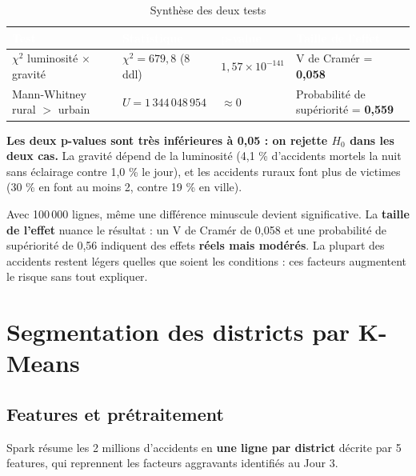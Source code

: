 \documentclass[11pt,a4paper]{report}
\newcommand{\hd}[1]{\textcolor{white}{\bfseries #1}}
\newcommand{\headrow}{\rowcolor{primary}}
\begin{document}
\begin{table}[H]
\centering
{}
\begin{tabularx}{\textwidth}{@{}l l l X@{}}
\toprule
\headrow \hd{Test} & \hd{Statistique} & \hd{p-value} & \hd{Taille de l'effet} \\
\midrule
$\chi^2$ luminosité $\times$ gravité & $\chi^2 = 679{,}8$ (8 ddl) & $1{,}57 \times 10^{-141}$ & V de Cramér = \textbf{0,058} \\
Mann-Whitney rural $>$ urbain & $U = 1\,344\,048\,954$ & $\approx 0$ & Probabilité de supériorité = \textbf{0,559} \\
\bottomrule
\end{tabularx}
\caption{Synthèse des deux tests}
\end{table}

\begin{keybox}[Interprétation]
\textbf{Les deux p-values sont très inférieures à 0,05 : on rejette $H_0$ dans les deux cas.} La gravité dépend de la luminosité (4,1 \% d'accidents mortels la nuit sans éclairage contre 1,0 \% le jour), et les accidents ruraux font plus de victimes (30 \% en font au moins 2, contre 19 \% en ville).
\end{keybox}

\begin{warnbox}
Avec 100\,000 lignes, même une différence minuscule devient significative. La \textbf{taille de l'effet} nuance le résultat : un V de Cramér de 0,058 et une probabilité de supériorité de 0,56 indiquent des effets \textbf{réels mais modérés}. La plupart des accidents restent légers quelles que soient les conditions : ces facteurs augmentent le risque sans tout expliquer.
\end{warnbox}

\section{Segmentation des districts par K-Means}

\subsection{Features et prétraitement}

Spark résume les 2 millions d'accidents en \textbf{une ligne par district} décrite par 5 features, qui reprennent les facteurs aggravants identifiés au Jour 3.
\end{document}
